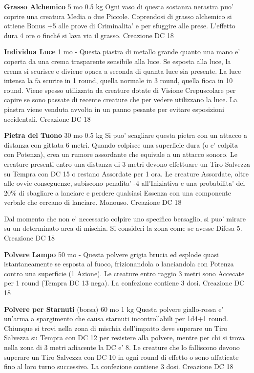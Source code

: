 \documentclass[a4paper,11pt,twoside,openany]{book}
\begin{document}
{\textbf{Grasso Alchemico} 5 mo 0.5 kg Ogni vaso di questa sostanza nerastra puo' coprire una creatura Media o due Piccole. Coprendosi di grasso alchemico si ottiene Bonus +5 alle prove di Criminalita' e per sfuggire alle prese. L'effetto dura 4 ore o finché si lava via il grasso. Creazione DC 18

\textbf{Individua Luce} 1 mo - Questa piastra di metallo grande quanto una mano e' coperta da una crema trasparente sensibile alla luce. Se esposta alla luce, la crema si scurisce e diviene opaca a seconda di quanta luce sia presente. La luce intensa la fa scurire in 1 round, quella normale in 3 round, quella fioca in 10 round. Viene spesso utilizzata da creature dotate di Visione Crepuscolare per capire se sono passate di recente creature che per vedere utilizzano la luce. La piastra viene venduta avvolta in un panno pesante per evitare esposizioni accidentali. Creazione DC 18

\textbf{Pietra del Tuono} 30 mo 0.5 kg Si puo' scagliare questa pietra con un attacco a distanza con gittata 6 metri. Quando colpisce una superficie dura (o e' colpita con Potenza), crea un rumore assordante che equivale a un attacco sonoro. Le creature presenti entro una distanza di 3 metri devono effettuare un Tiro Salvezza su Tempra con DC 15 o restano Assordate per 1 ora. Le creature Assordate, oltre alle ovvie conseguenze, subiscono penalita' -4 all'Iniziativa e una probabilita' del 20\% di sbagliare a lanciare e perdere qualsiasi Essenza con una componente verbale che cercano di lanciare. Monouso. Creazione DC 18

Dal momento che non e' necessario colpire uno specifico bersaglio, si puo' mirare su un determinato area di mischia. Si consideri la zona come se avesse Difesa 5. Creazione DC 18

\textbf{Polvere Lampo} 50 mo - Questa polvere grigia brucia ed esplode quasi istantaneamente se esposta al fuoco, frizionandola o lanciandola con Potenza contro una superficie (1 Azione). Le creature entro raggio 3 metri sono Accecate per 1 round (Tempra DC 13 nega). La confezione contiene 3 dosi. Creazione DC 18

\textbf{Polvere per Starnuti} (borsa) 60 mo 1 kg Questa polvere giallo-rossa e' un'arma a spargimento che causa starnuti incontrollabili per 1d4+1 round. Chiunque si trovi nella zona di mischia dell'impatto deve superare un Tiro Salvezza su Tempra con DC 12 per resistere alla polvere, mentre per chi si trova nella zona di 3 metri adiacente la DC e' 8. Le creature che lo falliscono devono superare un Tiro Salvezza con DC 10 in ogni round di effetto o sono affaticate fino al loro turno successivo. La confezione contiene 3 dosi. Creazione DC 18

}
\end{document}
